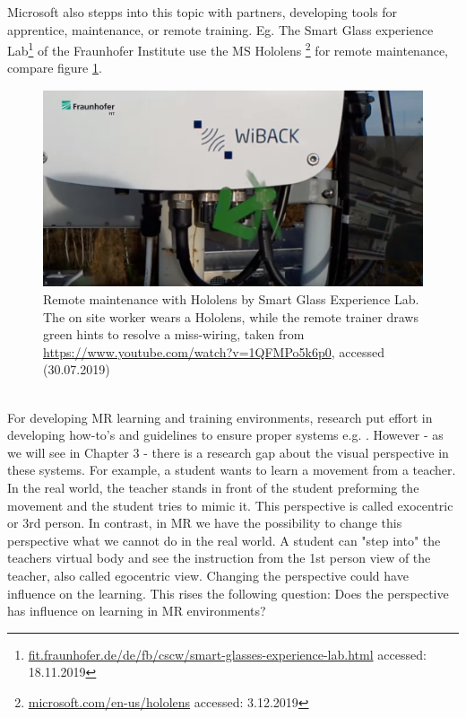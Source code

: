 Microsoft also stepps into this topic with partners, developing tools for apprentice, maintenance, or remote training. Eg. The Smart Glass experience Lab\footnote{\hyperlink{https://www.fit.fraunhofer.de/de/fb/cscw/smart-glasses-experience-lab.html}{fit.fraunhofer.de/de/fb/cscw/smart-glasses-experience-lab.html} accessed: 18.11.2019} of the Fraunhofer Institute use the MS Hololens \footnote{\hyperlink{https://www.microsoft.com/en-us/hololens}{microsoft.com/en-us/hololens} accessed: 3.12.2019} for remote maintenance, compare figure \ref{fig:fraunhofer}.
\begin{figure}
	\centering
	\includegraphics[width=1.0\textwidth]{img/fraunhofer.PNG}
	\caption{Remote maintenance with Hololens by Smart Glass Experience Lab. The on site worker wears a Hololens, while the remote trainer draws green hints to resolve a miss-wiring, taken from \hyperlink{https://www.youtube.com/watch?v=1QFMPo5k6p0}{https://www.youtube.com/watch?v=1QFMPo5k6p0}, accessed (30.07.2019)}
	\label{fig:fraunhofer}
\end{figure}\\
For developing MR learning and training environments, research put effort in developing how-to's and guidelines to ensure proper systems e.g. \cite{LaViola2017}. However - as we will see in Chapter 3 - there is a research gap about the visual perspective in these systems. For example, a student wants to learn a movement from a teacher. In the real world, the teacher stands in front of the student preforming the movement and the student tries to mimic it. This perspective is called exocentric or 3rd person. In contrast, in MR we have the possibility to change this perspective what we cannot do in the real world. A student can "step into" the teachers virtual body and see the instruction from the 1st person view of the teacher, also called egocentric view. Changing the perspective could have influence on the learning. This rises the following question: Does the perspective has influence on learning in MR environments? 
